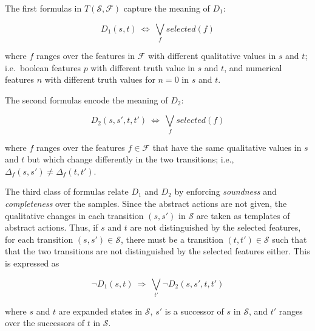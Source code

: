 \documentclass[letterpaper]{article} %
\newcommand{\Omit}[1]{}
\newcommand{\F}{\mathcal{F}}
\renewcommand{\S}{\mathcal{S}}
\begin{document}
\medskip
\noindent The first formulas in $T(\S,\F)$ capture the meaning of $D_1$:
  
\begin{equation}
  \label{eq:d1}
  D_1(s, t) \ \Leftrightarrow\ \textstyle \bigvee_{f}  selected(f)
\end{equation}

\noindent where $f$ ranges over the features in $\F$ with  different qualitative
values in $s$ and $t$; i.e.\ boolean features $p$ with different truth value
in $s$ and $t$, and numerical features $n$ with different truth values for
 $n=0$ in $s$ and $t$. 

\noindent The second formulas encode the meaning of $D_2$:

\begin{equation}
  \label{eq:d2}
  D_2(s, s', t, t') \ \Leftrightarrow\ \textstyle\bigvee_f  selected(f)
\end{equation}

\noindent where $f$ ranges over the features $f \in \F$ that have the same
qualitative values in $s$ and $t$ but which change differently in the two
transitions; i.e., $\Delta_f(s, s') \neq \Delta_f(t, t')$.

The third class of formulas relate $D_1$ and $D_2$ by enforcing \emph{soundness}
and \emph{completeness} over  the samples.  Since the abstract actions  are not given,
the qualitative changes in each  transition $(s,s')$ in $\S$
are  taken as templates  of abstract actions. Thus, if $s$ and $t$ are not distinguished by the selected features, 
for each transition $(s, s') \in \S$, there must be a transition $(t, t') \in \S$
such that that the two transitions are not distinguished by the selected features either.
This is expressed as

\begin{equation}
  \label{eq:bridge1}
  \neg D_1(s, t) \  \Rightarrow\ \textstyle\bigvee_{t'} \neg D_2(s, s', t, t')
\end{equation}

\noindent where $s$ and $t$ are expanded states in  $\S$, $s'$ is a successor of $s$ in $\S$,
and $t'$ ranges over the successors of $t$ in $\S$.

\Omit{ %
  Refer to this as an ``efficiency optimization'' ..
  
  such that $s < t$, and transition $(s,s')$ in $\S$. Due to the symmetry breaking caused by the constraint $s < t$,
  the following formulas are also needed

\begin{equation}
  \label{eq:bridge2}
  \neg D_1(s, t) \, \rightarrow \, \bigvee_{s'} \neg D_2(s, s', t, t')
\end{equation}

\noindent where the  iteration in the right hand disjunction goes over the different successor states $s'$ of the first argument
$s$ of $D_1$ that are in the sample set $\S$, $s$ and $t$ are states in $\S_1$ as before with $s < t$, and $t'$ is a
successor state of $t$ in $\S$; i.e. $(t,t') \in \S$.
}
\end{document}
